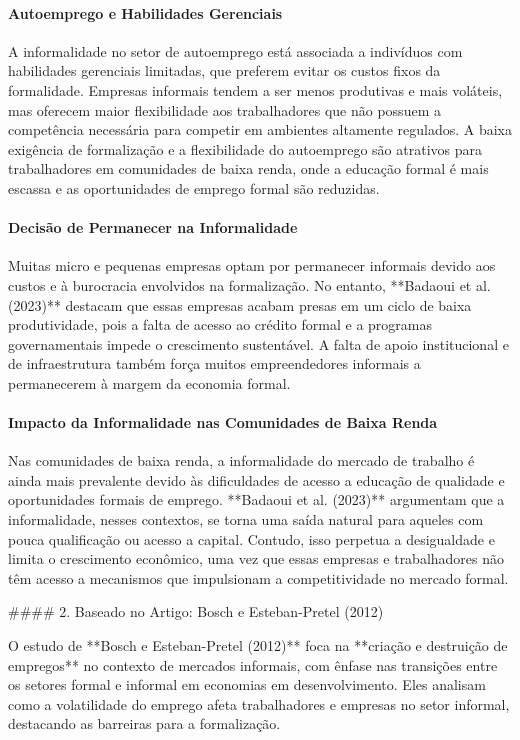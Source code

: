 \documentclass{article}
\begin{document}
\paragraph{Autoemprego e Habilidades Gerenciais}
A informalidade no setor de autoemprego está associada a indivíduos com habilidades gerenciais limitadas, que preferem evitar os custos fixos da formalidade. Empresas informais tendem a ser menos produtivas e mais voláteis, mas oferecem maior flexibilidade aos trabalhadores que não possuem a competência necessária para competir em ambientes altamente regulados. A baixa exigência de formalização e a flexibilidade do autoemprego são atrativos para trabalhadores em comunidades de baixa renda, onde a educação formal é mais escassa e as oportunidades de emprego formal são reduzidas.

\paragraph{Decisão de Permanecer na Informalidade}
Muitas micro e pequenas empresas optam por permanecer informais devido aos custos e à burocracia envolvidos na formalização. No entanto, **Badaoui et al. (2023)** destacam que essas empresas acabam presas em um ciclo de baixa produtividade, pois a falta de acesso ao crédito formal e a programas governamentais impede o crescimento sustentável. A falta de apoio institucional e de infraestrutura também força muitos empreendedores informais a permanecerem à margem da economia formal.

\paragraph{Impacto da Informalidade nas Comunidades de Baixa Renda}
Nas comunidades de baixa renda, a informalidade do mercado de trabalho é ainda mais prevalente devido às dificuldades de acesso a educação de qualidade e oportunidades formais de emprego. **Badaoui et al. (2023)** argumentam que a informalidade, nesses contextos, se torna uma saída natural para aqueles com pouca qualificação ou acesso a capital. Contudo, isso perpetua a desigualdade e limita o crescimento econômico, uma vez que essas empresas e trabalhadores não têm acesso a mecanismos que impulsionam a competitividade no mercado formal.

#### 2. Baseado no Artigo: Bosch e Esteban-Pretel (2012)

O estudo de **Bosch e Esteban-Pretel (2012)** foca na **criação e destruição de empregos** no contexto de mercados informais, com ênfase nas transições entre os setores formal e informal em economias em desenvolvimento. Eles analisam como a volatilidade do emprego afeta trabalhadores e empresas no setor informal, destacando as barreiras para a formalização.
\end{document}
